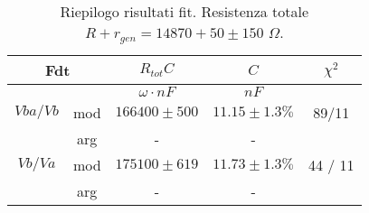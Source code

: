 \begin{table}[H]
\begin{center}
\begin{tabular}{|c|c|c|c|c|}
\hline
\multicolumn{ 2}{|c|}{Fdt} & $R_{tot}C$ & $C$ & $\chi^{2}$ \\ \hline
\multicolumn{ 2}{|c|}{   } & $\omega\cdot nF$ & $nF$ &  \\ \hline

\multicolumn{ 1}{|c|}{$Vba/Vb$} & mod 
& $166400\pm500$  & $11.15\pm1.3\%$ & 89/11  \\

\multicolumn{ 1}{|c|}{} & arg & - & -  &  \\ \hline

\multicolumn{ 1}{|c|}{$Vb/Va$} & mod 
& $175100\pm619$ & $11.73\pm1.3\%$ & 44 / 11  \\

\multicolumn{ 1}{|c|}{} & arg & - & - &  \\ \hline

\end{tabular}
\end{center}
\caption{
Riepilogo risultati fit.
Resistenza totale $ R + r_{gen} = 14870 + 50\pm 150$ $\Omega$.
}
\label{C2_P2_risultati}
\end{table}

